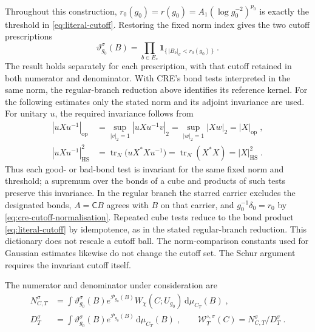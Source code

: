 \documentclass[11pt]{article}
\newcommand{\dd}{\mathrm{d}}
\newcommand{\tr}{\operatorname{tr}}
\begin{document}
Throughout this construction, $r_0(g_0)=r(g_0)=A_1(\log g_0^{-2})^{p_0}$ is exactly the threshold in \eqref{eq:literal-cutoff}. Restoring the fixed norm index gives the two cutoff prescriptions
\begin{equation}\label{eq:marginal-two-cutoffs}
    \vartheta_{g_0}^{\sigma}(B)
        =\prod_{b\in E_*}
            \mathbf1_{\{\,|B_b|_\sigma<r_0(g_0)\,\}}\;.
\end{equation}
The result holds separately for each prescription, with that cutoff retained in both numerator and denominator. With CRE's bond tests interpreted in the same norm, the regular-branch reduction above identifies its reference kernel. For the following estimates only the stated norm and its adjoint invariance are used. For unitary $u$, the required invariance follows from
\begin{equation}\label{eq:marginal-cutoff-invariance}
    \begin{aligned}
        |uXu^{-1}|_{\mathrm{op}}
            &=\sup_{|v|_2=1}|uXu^{-1}v|_2
                =\sup_{|w|_2=1}|Xw|_2=|X|_{\mathrm{op}}\;,\\
        |uXu^{-1}|_{\mathrm{HS}}^2
            &=\tr_N\bigl(uX^*Xu^{-1}\bigr)
                =\tr_N(X^*X)=|X|_{\mathrm{HS}}^2\;.
    \end{aligned}
\end{equation}
Thus each good- or bad-bond test is invariant for the same fixed norm and threshold; a supremum over the bonds of a cube and products of such tests preserve this invariance. In the regular branch the starred carrier excludes the designated bonds, $A=\mathsf C B$ agrees with $B$ on that carrier, and $g_0^{-1}\delta_0=r_0$ by \eqref{eq:cre-cutoff-normalisation}. Repeated cube tests reduce to the bond product \eqref{eq:literal-cutoff} by idempotence, as in the stated regular-branch reduction. This dictionary does not rescale a cutoff ball. The norm-comparison constants used for Gaussian estimates likewise do not change the cutoff set. The Schur argument requires the invariant cutoff itself.

The numerator and denominator under consideration are
\begin{equation}\label{eq:marginal-literal-ratio}
    \begin{aligned}
        N_{C,T}^{\sigma}&=\int\vartheta_{g_0}^{\sigma}(B)e^{\mathcal P_{g_0}(B)}
            W_\chi(C;U_{g_0})\,\dd\mu_{C_T}(B)\;,\\
        D_T^{\sigma}&=\int\vartheta_{g_0}^{\sigma}(B)e^{\mathcal P_{g_0}(B)}
            \,\dd\mu_{C_T}(B)\;,
        \qquad \mathcal W_T^{\circ,\sigma}(C)=N_{C,T}^{\sigma}/D_T^{\sigma}\;.
    \end{aligned}
\end{equation}
\end{document}
